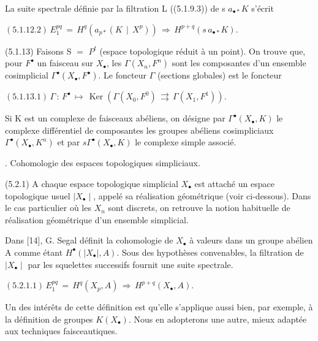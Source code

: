 \documentclass[11pt,twoside]{article}
\newcommand{\DFormula}[1]{%
  \par\smallskip\noindent\hspace*{0pt}\(\displaystyle #1\)\par\smallskip
}
\begin{document}
La suite spectrale définie par la filtration L ((5.1.9.3)) de s \(a_{\bullet \ast }K\) s’écrit\par
\par\medskip
\DFormula{(5.1.12.2)\,E_{1}^{pq}\,=\,H^{q}(a_{p\ast }(K\,\mid \,X^{p}))\,\Rightarrow \,H^{p+q}(s\,a_{\bullet \ast }K).}
\par\medskip
(5.1.13) Faisons S \(=\) \(P^{t}\) (espace topologique réduit à un point). On trouve que, pour \(F^{\bullet }\) un faisceau sur \(X_{\bullet }\), les \(\Gamma (X_{n},F^{n})\) sont les composantes d’un ensemble cosimplicial \(\Gamma ^{\bullet }(X_{\bullet },F^{\bullet })\). Le foncteur \(\Gamma \) (sections globales) est le foncteur\par
\par\medskip
\DFormula{(5.1.13.1)\,\Gamma \,:\,F^{\bullet }\,↦\,\operatorname{Ker}(\Gamma (X_{0},F^{0})\,\rightrightarrows \,\Gamma (X_{1},F^{1})).}
\par\medskip
Si K est un complexe de faisceaux abéliens, on désigne par \(\Gamma ^{\bullet }(X_{\bullet },K)\) le complexe différentiel de composantes les groupes abéliens cosimpliciaux \(\Gamma ^{\bullet }(X_{\bullet },K^{n})\) et par \(s\Gamma ^{\bullet }(X_{\bullet },K)\) le complexe simple associé.\par
\par{}. Cohomologie des espaces topologiques simpliciaux.\par
\par\medskip
(5.2.1) A chaque espace topologique simplicial \(X_{\bullet }\) est attaché un espace topologique usuel \(\mid X_{\bullet }\mid \), appelé sa réalisation géométrique (voir ci-dessous). Dans le cas particulier où les \(X_{n}\) sont discrets, on retrouve la notion habituelle de réalisation géométrique d’un ensemble simplicial.\par
\par\medskip
Dans [14], G. Segal définit la cohomologie de \(X_{\bullet }\) à valeurs dans un groupe abélien A comme étant \(H^{\bullet }(\mid X_{\bullet }\mid ,A)\). Sous des hypothèses convenables, la filtration de \(\mid X_{\bullet }\mid \) par les squelettes successifs fournit une suite spectrale.\par
\par\medskip
\DFormula{(5.2.1.1)\,E_{1}^{pq}\,=\,H^{q}(X_{p},A)\,\Rightarrow \,H^{p+q}(X_{\bullet },A).}
\par\medskip
Un des intérêts de cette définition est qu’elle s’applique aussi bien, par exemple, à la définition de groupes \(K(X_{\bullet })\). Nous en adopterons une autre, mieux adaptée aux techniques faisceautiques.\par
\end{document}
